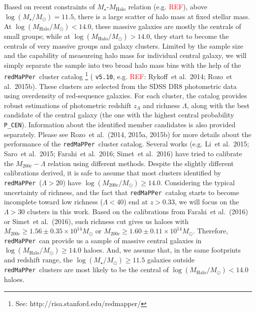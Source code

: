 \documentclass[preprint]{aastex}
\def\etal{{\ et al.~}}
\def\redm{\texttt{redMaPPer\ }}
\def\logms{$\log (M_{\star}/M_{\odot})$}
\def\logmh{$\log (M_{\mathrm{Halo}}/M_{\odot})$}
\newcommand{\addref}{{\textcolor{red}{REF}}}
\begin{document}
\begin{CJK*}{UTF8}{gbsn}
    Based on recent constraints of $M_{\star}$-$M_{\mathrm{Halo}}$ 
    relation (e.g. \addref), above \logms$ = 11.5$, there is a large scatter 
    of halo mass at fixed stellar mass.  
    At \logmh$<14.0$, these massive galaxies are mostly the centrals of small 
    groups; while at \logmh$>14.0$, they start to become the centrals of very 
    massive groups and galaxy clusters.   
    Limited by the sample size and the capability of measureing halo mass for 
    individual central galaxy, we will simply separate the sample into two 
    broad halo mass bins with the help of the \redm cluster catalog 
    \footnote{See: http://risa.stanford.edu/redmapper/} (
    \texttt{v5.10}, e.g. \addref: Rykoff\etal 2014; Rozo\etal 2015b).
    These clusters are selected from the SDSS DR8 photometric data 
    using overdensity of red-sequence galaxies. 
    For each cluster, the catalog provides robust estimations of 
    photometric redshift $z_{\Lambda}$ and richness $\Lambda$, along with 
    the best candidate of the central galaxy (the one with the highest 
    central probability \texttt{P\_CEN}).
    Information about the identified member candidates is also provided 
    separately. 
    Please see Rozo\etal (2014, 2015a, 2015b) for more details about the 
    performance of the \redm cluster catalog.      
    Several works (e.g. Li\etal 2015; Saro\etal 2015; Farahi\etal 2016; 
    Simet\etal 2016) have tried to calibrate the $M_{200c}-\Lambda$ relation 
    using different methods.
    Despite the slightly different calibrations derived, it is safe to 
    assume that most clusters identified by \redm ($\Lambda > 20$) have
    $\log (M_{200c}/M_{\odot}) \geq 14.0$.  
    Considering the typical uncertainty of richness, and the fact that 
    \redm catalog starts to become incomplete toward low richness 
    ($\Lambda < 40$) end at $z > 0.33$, we will focus on the $\Lambda > 30$
    clusters in this work.  
    Based on the calibrations from Farahi\etal (2016) or Simet\etal (2016), 
    such richness cut gives us haloes with 
    $M_{200c} \geq 1.56\pm0.35 \times 10^{14} M_{\odot}$ or 
    $M_{200c} \geq 1.60\pm0.11 \times 10^{14} M_{\odot}$.  
    Therefore, \redm can provide us a sample of massive central galaxies in
    \logmh$\geq 14.0$ haloes.  
    And, we assume that, in the same footprints and redshift range, the 
    \logms$\geq 11.5$ galaxies outside \redm clusters are most likely to be 
    the central of \logmh$< 14.0$ haloes. 
    

\end{CJK*}
\end{document}
